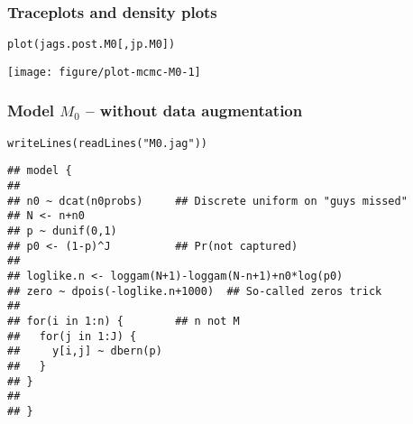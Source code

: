 \documentclass[color=usenames,dvipsnames]{beamer}\usepackage[]{graphicx}\usepackage[]{color}
\makeatletter
\newcommand{\hlstr}[1]{\textcolor[rgb]{0.749,0.012,0.012}{#1}}%
\newcommand{\hlstd}[1]{\textcolor[rgb]{0,0,0}{#1}}%
\newcommand{\hlkwd}[1]{\textcolor[rgb]{0.004,0.004,0.506}{#1}}%
\newenvironment{kframe}{%
 \def\at@end@of@kframe{}%
 \ifinner\ifhmode%
  \def\at@end@of@kframe{\end{minipage}}%
  \begin{minipage}{\columnwidth}%
 \fi\fi%
 \def\FrameCommand##1{\hskip\@totalleftmargin \hskip-\fboxsep
 \colorbox{shadecolor}{##1}\hskip-\fboxsep
     \hskip-\linewidth \hskip-\@totalleftmargin \hskip\columnwidth}%
 \MakeFramed {\advance\hsize-\width
   \@totalleftmargin\z@ \linewidth\hsize
   \@setminipage}}%
 {\par\unskip\endMakeFramed%
 \at@end@of@kframe}
\newenvironment{knitrout}{}{} %
\makeatother
\begin{document}
\begin{frame}[fragile]
  \frametitle{Traceplots and density plots}
\begin{knitrout}\footnotesize
{}\color{fgcolor}\begin{kframe}
\begin{alltt}
\hlkwd{plot}\hlstd{(jags.post.M0[,jp.M0])}
\end{alltt}
\end{kframe}

{\centering \texttt{[image: figure/plot-mcmc-M0-1]} 

}



\end{knitrout}
\end{frame}




\begin{frame}[fragile]
  \frametitle{Model $M_0$ -- without data augmentation}
\vspace{-3pt}
\begin{knitrout}\footnotesize
{}\color{fgcolor}\begin{kframe}
\begin{alltt}
\hlkwd{writeLines}\hlstd{(}\hlkwd{readLines}\hlstd{(}\hlstr{"M0.jag"}\hlstd{))}
\end{alltt}
\begin{verbatim}
## model {
## 
## n0 ~ dcat(n0probs)     ## Discrete uniform on "guys missed"
## N <- n+n0           
## p ~ dunif(0,1)
## p0 <- (1-p)^J          ## Pr(not captured)
## 
## loglike.n <- loggam(N+1)-loggam(N-n+1)+n0*log(p0)
## zero ~ dpois(-loglike.n+1000)  ## So-called zeros trick
## 
## for(i in 1:n) {        ## n not M
##   for(j in 1:J) {
##     y[i,j] ~ dbern(p)
##   }
## }
## 
## }
\end{verbatim}
\end{kframe}
\end{knitrout}
\end{frame}
\end{document}
